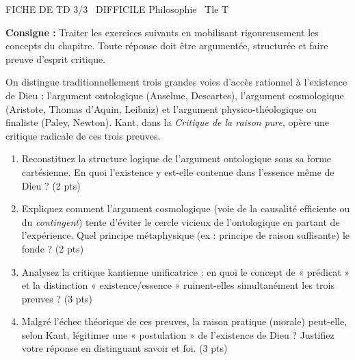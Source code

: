 \documentclass[11pt]{article}
\begin{document}
\begin{tcolorbox}[enhanced,colback=popink,colframe=popink,arc=10pt,boxrule=0pt,left=12pt,right=12pt,top=9pt,bottom=9pt]
{\color{white}\popxbold\small FICHE DE TD 3/3 \textbullet\ DIFFICILE \hfill Philosophie \textbullet\ Tle T\par}
\end{tcolorbox}
\vspace{4pt}
\noindent\textbf{Consigne :} Traiter les exercices suivants en mobilisant rigoureusement les concepts du chapitre. Toute réponse doit être argumentée, structurée et faire preuve d'esprit critique.

\begin{exercice}
On distingue traditionnellement trois grandes voies d'accès rationnel à l'existence de Dieu : l'argument ontologique (Anselme, Descartes), l'argument cosmologique (Aristote, Thomas d'Aquin, Leibniz) et l'argument physico-théologique ou finaliste (Paley, Newton). Kant, dans la \textit{Critique de la raison pure}, opère une critique radicale de ces trois preuves.
\begin{enumerate}
    \item Reconstituez la structure logique de l'argument ontologique sous sa forme cartésienne. En quoi l'existence y est-elle contenue dans l'essence même de Dieu ? (2 pts)
    \item Expliquez comment l'argument cosmologique (voie de la causalité efficiente ou du \textit{contingent}) tente d'éviter le cercle vicieux de l'ontologique en partant de l'expérience. Quel principe métaphysique (ex : principe de raison suffisante) le fonde ? (2 pts)
    \item Analysez la critique kantienne unificatrice : en quoi le concept de « prédicat » et la distinction « existence/essence » ruinent-elles simultanément les trois preuves ? (3 pts)
    \item Malgré l'échec théorique de ces preuves, la raison pratique (morale) peut-elle, selon Kant, légitimer une « postulation » de l'existence de Dieu ? Justifiez votre réponse en distinguant savoir et foi. (3 pts)
\end{enumerate}
\end{exercice}
\end{document}
